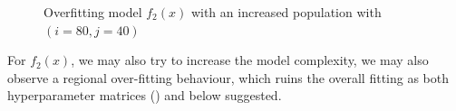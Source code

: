 \documentclass{tron}
\begin{document}
\begin{figure}[H]
	\centering
	\caption{Overfitting model $f_2(x)$ with an increased population with $(i=80, j=40)$\label{fig:p3:2:fit:2:over}}
\end{figure}

For $f_2(x)$, we may also try to increase the model complexity, we may also observe a regional over-fitting behaviour, which ruins the overall fitting as both hyperparameter matrices () and  below suggested.
\end{document}
